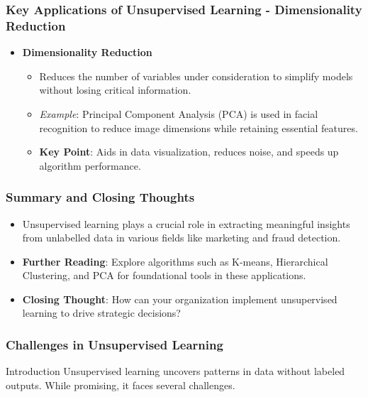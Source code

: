 \documentclass[aspectratio=169]{beamer}
\begin{document}
\begin{frame}[fragile]
    \frametitle{Key Applications of Unsupervised Learning - Dimensionality Reduction}
    \begin{itemize}
        \item \textbf{Dimensionality Reduction}
        \begin{itemize}
            \item Reduces the number of variables under consideration to simplify models without losing critical information.
            \item \textit{Example}: Principal Component Analysis (PCA) is used in facial recognition to reduce image dimensions while retaining essential features.
            \item \textbf{Key Point}: Aids in data visualization, reduces noise, and speeds up algorithm performance.
        \end{itemize}
    \end{itemize}
\end{frame}

\begin{frame}[fragile]
    \frametitle{Summary and Closing Thoughts}
    \begin{itemize}
        \item Unsupervised learning plays a crucial role in extracting meaningful insights from unlabelled data in various fields like marketing and fraud detection.
        \item \textbf{Further Reading}: Explore algorithms such as K-means, Hierarchical Clustering, and PCA for foundational tools in these applications.
        \item \textbf{Closing Thought}: How can your organization implement unsupervised learning to drive strategic decisions?
    \end{itemize}
\end{frame}

\begin{frame}[fragile]
    \frametitle{Challenges in Unsupervised Learning}
    \begin{block}{Introduction}
        Unsupervised learning uncovers patterns in data without labeled outputs. While promising, it faces several challenges.
    \end{block}
\end{frame}
\end{document}
